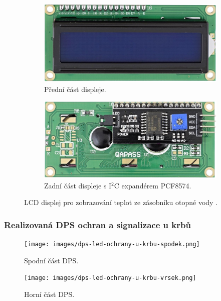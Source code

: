 \begin{figure}[H]
\centering
\begin{subfigure}{.5\textwidth}
  \centering
  \includegraphics[width=0.9\linewidth]{images/predni-cast-lcd-displeje.png}
  \caption{Přední část displeje.}
  \label{fig:predni-cast-lcd-displeje}
\end{subfigure}%
\begin{subfigure}{.5\textwidth}
  \centering
  \includegraphics[width=0.9\linewidth]{images/zadni-cast-lcd-displeje-s-expanderem-pcf8574.png}
  \caption{Zadní část displeje s I$^2$C expandérem PCF8574.}
  \label{fig:zadni-cast-lcd-displeje-s-expanderem-pcf857}
\end{subfigure}
\caption{LCD displej pro zobrazování teplot ze zásobníku otopné vody \cite{lcd-displej}.}
\label{fig:lcd-displej}
\end{figure}

\subsubsection{Realizovaná DPS ochran a signalizace u krbů}

\begin{figure}[H]
    \centering
    \texttt{[image: images/dps-led-ochrany-u-krbu-spodek.png]}
    \caption[Spodní část DPS.]{Spodní část DPS.}
    \label{fig:dps-led-ochrany-u-krbu-spodek}
\end{figure}

\begin{figure}[H]
    \centering
    \texttt{[image: images/dps-led-ochrany-u-krbu-vrsek.png]}
    \caption[Horní část DPS.]{Horní část DPS.}
    \label{fig:dps-led-ochrany-u-krbu-vrsek}
\end{figure}

